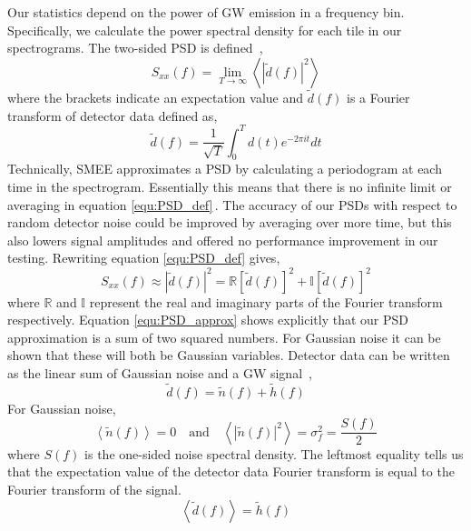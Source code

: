 Our statistics depend on the power of GW emission in a frequency bin. Specifically, we calculate the power spectral density for each tile in our spectrograms. The two-sided PSD is defined~\cite{miller2012probability}, 
\begin{equation}
\label{equ:PSD_def}
    S_{xx}(f) = \lim_{T \to \infty} \left\langle |\tilde{d}(f)|^{2} \right\rangle
\end{equation}
where the brackets indicate an expectation value and $\tilde{d}(f)$ is a Fourier transform of detector data defined as,
\begin{equation}
    \tilde{d}(f) = \frac{1}{\sqrt{T}} \int_{0}^{T} d(t)e^{-2\pi it}dt
\end{equation}
Technically, SMEE approximates a PSD by calculating a periodogram at each time in the spectrogram. Essentially this means that there is no infinite limit or averaging in equation \ref{equ:PSD_def}\,. The accuracy of our PSDs with respect to random detector noise could be improved by averaging over more time, but this also lowers signal amplitudes and offered no performance improvement in our testing. Rewriting equation \ref{equ:PSD_def} gives,
\begin{equation}
\label{equ:PSD_approx}
    S_{xx}(f) \approx |\tilde{d}(f)|^{2} = \mathbb{R}[\tilde{d}(f)]^{2} + \mathbb{I}[\tilde{d}(f)]^{2}
\end{equation}
where $\mathbb{R}$ and $\mathbb{I}$ represent the real and imaginary parts of the Fourier transform respectively. Equation \ref{equ:PSD_approx} shows explicitly that our PSD approximation is a sum of two squared numbers. For Gaussian noise it can be shown that these will both be Gaussian variables. Detector data can be written as the linear sum of Gaussian noise and a GW signal~\cite{veitch:15},
\begin{equation}
\label{equ:d_def}
    \tilde{d}(f) = \tilde{n}(f) + \tilde{h}(f)
\end{equation}
For Gaussian noise,
\begin{equation}
\label{equ:gaus_noise}
    \left\langle \tilde{n}(f) \right\rangle = 0 \quad\text{and}\quad \left\langle |\tilde{n}(f)|^{2} \right\rangle = \sigma_{f}^{2} = \frac{S(f)}{2}
\end{equation}
where $S(f)$ is the one-sided noise spectral density. The leftmost equality tells us that the expectation value of the detector data Fourier transform is equal to the Fourier transform of the signal.
\begin{equation}
\label{equ:d_mean}
    \left\langle \tilde{d}(f) \right\rangle = \tilde{h}(f) %
\end{equation}
